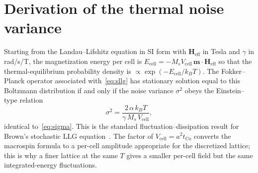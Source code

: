 \documentclass[11pt,a4paper]{article}
\newcommand{\mb}[1]{\mathbf{#1}}
\newcommand{\Heff}{\mb{H}_{\text{eff}}}
\newcommand{\Ms}{M_s}
\newcommand{\Vcell}{V_{\text{cell}}}
\newcommand{\tCo}{t_{\text{Co}}}
\newcommand{\kB}{k_B}
\begin{document}
\appendix
\section{Derivation of the thermal noise variance}\label{app:fdt}

Starting from the Landau--Lifshitz equation in SI form with
$\Heff$ in Tesla and $\gamma$ in rad/s/T, the magnetization energy
per cell is $E_{\text{cell}} = -\Ms \Vcell \, \mb{m} \cdot \Heff$ so
that the thermal-equilibrium probability density is
$\propto \exp(-E_{\text{cell}}/\kB T)$. The Fokker--Planck operator
associated with~\eqref{eq:sllg} has stationary solution equal to this
Boltzmann distribution if and only if the noise variance
$\sigma^2$ obeys the Einstein--type relation
%
\begin{equation}
\sigma^2 = \frac{2\, \alpha\, \kB T}{\gamma\, \Ms\, \Vcell},
\end{equation}
%
identical to~\eqref{eq:sigma}. This is the standard
fluctuation--dissipation result for Brown's stochastic LLG
equation~\cite{brown1963,garcia1998}. The factor of $\Vcell = a^2
\tCo$ converts the macrospin formula to a per-cell amplitude
appropriate for the discretized lattice; this is why a finer lattice
at the same $T$ gives a smaller per-cell field but the same
integrated-energy fluctuations.
\end{document}
